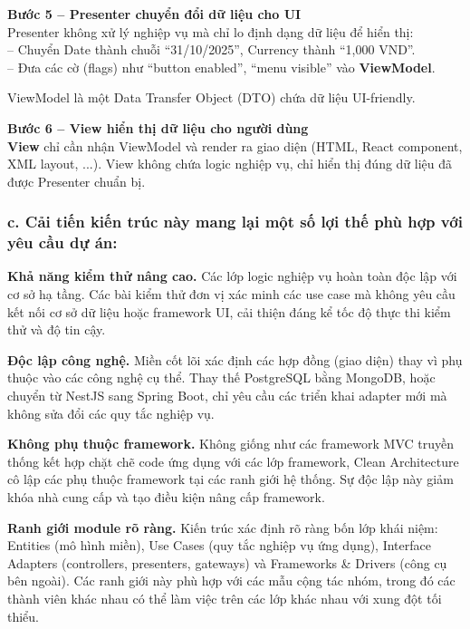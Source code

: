 \textbf{Bước 5 -- Presenter chuyển đổi dữ liệu cho UI}\\
Presenter không xử lý nghiệp vụ mà chỉ lo định dạng dữ liệu để hiển thị:\\
-- Chuyển Date thành chuỗi ``31/10/2025'', Currency thành ``1,000 VND''.\\
-- Đưa các cờ (flags) như ``button enabled'', ``menu visible'' vào \textbf{ViewModel}.

ViewModel là một Data Transfer Object (DTO) chứa dữ liệu UI-friendly.
\vspace{0.3cm}

\textbf{Bước 6 -- View hiển thị dữ liệu cho người dùng}\\
\textbf{View} chỉ cần nhận ViewModel và render ra giao diện (HTML, React component, XML layout, ...). View không chứa logic nghiệp vụ, chỉ hiển thị đúng dữ liệu đã được Presenter chuẩn bị.

\subsubsection*{c. Cải tiến kiến trúc này mang lại một số lợi thế phù hợp với yêu cầu dự án:}

\textbf{Khả năng kiểm thử nâng cao.} Các lớp logic nghiệp vụ hoàn toàn độc lập với cơ sở hạ tầng. Các bài kiểm thử đơn vị xác minh các use case mà không yêu cầu kết nối cơ sở dữ liệu hoặc framework UI, cải thiện đáng kể tốc độ thực thi kiểm thử và độ tin cậy.

\textbf{Độc lập công nghệ.} Miền cốt lõi xác định các hợp đồng (giao diện) thay vì phụ thuộc vào các công nghệ cụ thể. Thay thế PostgreSQL bằng MongoDB, hoặc chuyển từ NestJS sang Spring Boot, chỉ yêu cầu các triển khai adapter mới mà không sửa đổi các quy tắc nghiệp vụ.

\textbf{Không phụ thuộc framework.} Không giống như các framework MVC truyền thống kết hợp chặt chẽ code ứng dụng với các lớp framework, Clean Architecture cô lập các phụ thuộc framework tại các ranh giới hệ thống. Sự độc lập này giảm khóa nhà cung cấp và tạo điều kiện nâng cấp framework.

\textbf{Ranh giới module rõ ràng.} Kiến trúc xác định rõ ràng bốn lớp khái niệm: Entities (mô hình miền), Use Cases (quy tắc nghiệp vụ ứng dụng), Interface Adapters (controllers, presenters, gateways) và Frameworks \& Drivers (công cụ bên ngoài). Các ranh giới này phù hợp với các mẫu cộng tác nhóm, trong đó các thành viên khác nhau có thể làm việc trên các lớp khác nhau với xung đột tối thiểu.


